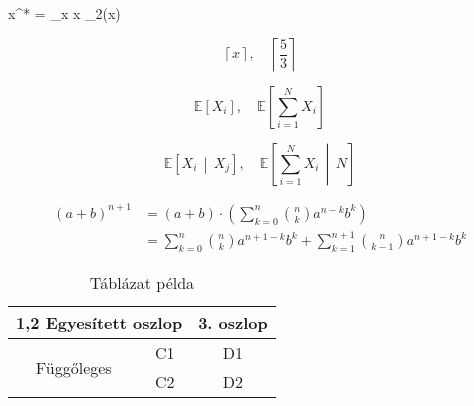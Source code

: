 \documentclass{article}
\begin{document}
x^* = \argmax_{x \in [0,1]} x \log_2(x)

\newcommand{\ceil}[1]{\left\lceil #1 \right\rceil}

\[
\ceil{x}, \quad \ceil{\frac{5}{3}}
\]

\newcommand{\E}[1]{\mathbb{E}\left[#1\right]}

\[
\E{X_i}, \quad \E{\sum_{i=1}^{N} X_i}
\]

\newcommand{\CE}[2]{\mathbb{E}\left[#1 \, \middle| \, #2\right]}

\[
\CE{X_i}{X_j}, \quad \CE{\sum_{i=1}^{N} X_i}{N}
\]
\newpage

\begin{align}
(a + b)^{n+1} &= (a+b) \cdot \left( \sum_{k=0}^n \binom{n}{k} a^{n-k}b^k \right) \\
              &= \sum_{k=0}^n \binom{n}{k} a^{n+1-k}b^k + \sum_{k=1}^{n+1} \binom{n}{k-1} a^{n+1-k}b^k
\end{align}


\begin{table}[htbp]
    \centering
    \caption{Táblázat példa}
    \begin{tabular}{|c|c|c|}
        \hline
        \multicolumn{2}{|c|}{1,2 Egyesített oszlop} & 3. oszlop \\ \hline
        \multirow{2}{*}{Függőleges} & C1 & D1 \\ \cline{2-3}
        & C2 & D2 \\ \hline
    \end{tabular}
\end{table}
\end{document}
